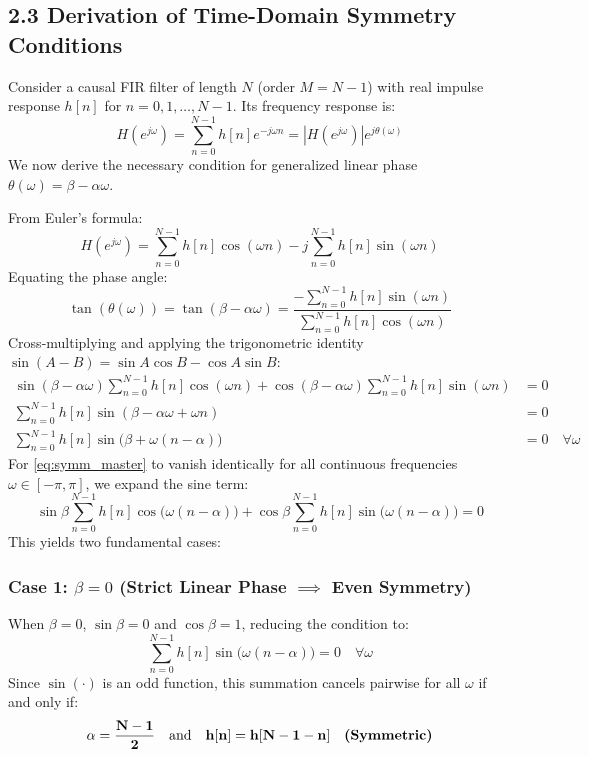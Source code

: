\documentclass[11pt,a4paper]{article}
\begin{document}
\subsection{2.3 Derivation of Time-Domain Symmetry Conditions}
Consider a causal FIR filter of length $N$ (order $M = N-1$) with real impulse response $h[n]$ for $n = 0, 1, \dots, N-1$. Its frequency response is:
\begin{equation}
H(e^{j\omega}) = \sum_{n=0}^{N-1} h[n] e^{-j\omega n} = |H(e^{j\omega})| e^{j\theta(\omega)}
\end{equation}
We now derive the necessary condition for generalized linear phase $\theta(\omega) = \beta - \alpha \omega$.

From Euler's formula:
\begin{equation}
H(e^{j\omega}) = \sum_{n=0}^{N-1} h[n] \cos(\omega n) - j \sum_{n=0}^{N-1} h[n] \sin(\omega n)
\end{equation}
Equating the phase angle:
\begin{equation}
\tan(\theta(\omega)) = \tan(\beta - \alpha \omega) = \frac{-\sum_{n=0}^{N-1} h[n] \sin(\omega n)}{\sum_{n=0}^{N-1} h[n] \cos(\omega n)}
\end{equation}
Cross-multiplying and applying the trigonometric identity $\sin(A-B) = \sin A \cos B - \cos A \sin B$:
\begin{align}
\sin(\beta - \alpha \omega) \sum_{n=0}^{N-1} h[n] \cos(\omega n) + \cos(\beta - \alpha \omega) \sum_{n=0}^{N-1} h[n] \sin(\omega n) &= 0 \nonumber \\
\sum_{n=0}^{N-1} h[n] \sin(\beta - \alpha \omega + \omega n) &= 0 \nonumber \\
\sum_{n=0}^{N-1} h[n] \sin\big(\beta + \omega(n - \alpha)\big) &= 0 \quad \forall \omega
\label{eq:symm_master}
\end{align}
For \eqref{eq:symm_master} to vanish identically for all continuous frequencies $\omega \in [-\pi, \pi]$, we expand the sine term:
\begin{equation}
\sin\beta \sum_{n=0}^{N-1} h[n] \cos\big(\omega(n - \alpha)\big) + \cos\beta \sum_{n=0}^{N-1} h[n] \sin\big(\omega(n - \alpha)\big) = 0
\end{equation}
This yields two fundamental cases:

\subsubsection{Case 1: $\beta = 0$ (Strict Linear Phase $\implies$ Even Symmetry)}
When $\beta = 0$, $\sin\beta = 0$ and $\cos\beta = 1$, reducing the condition to:
\begin{equation}
\sum_{n=0}^{N-1} h[n] \sin\big(\omega(n - \alpha)\big) = 0 \quad \forall \omega
\end{equation}
Since $\sin(\cdot)$ is an odd function, this summation cancels pairwise for all $\omega$ if and only if:
\begin{equation}
\mathbf{\alpha = \frac{N-1}{2}} \quad \text{and} \quad \mathbf{h[n] = h[N-1-n]} \quad \text{\textbf{(Symmetric)}}
\label{eq:symmetric_cond}
\end{equation}
\end{document}
